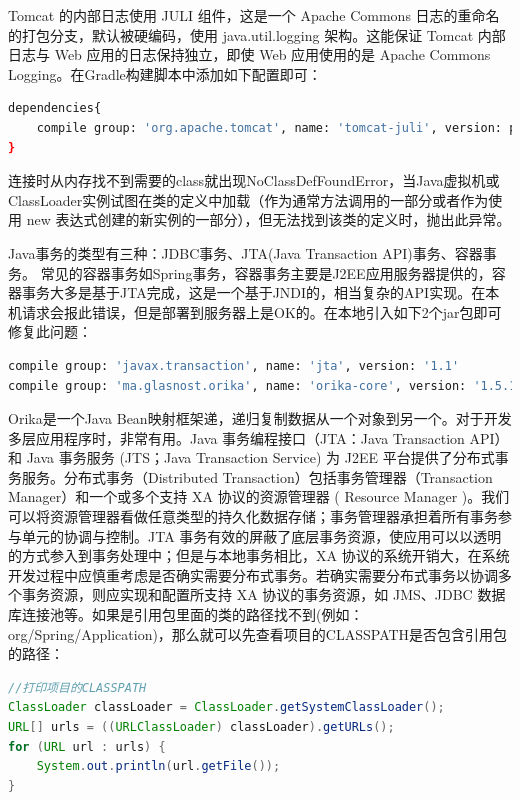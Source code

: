 \documentclass[12pt]{book}
\numberwithin{dummy}{section}
\theoremstyle{ocrenumbox}
\theoremstyle{blacknumex}
\theoremstyle{blacknumbox}
\theoremstyle{ocrenum}
\begin{document}
Tomcat 的内部日志使用 JULI 组件，这是一个 Apache Commons 日志的重命名的打包分支，默认被硬编码，使用 java.util.logging 架构。这能保证 Tomcat 内部日志与 Web 应用的日志保持独立，即使 Web 应用使用的是 Apache Commons Logging。在Gradle构建脚本中添加如下配置即可：

\begin{lstlisting}[language=Bash]
dependencies{
	compile group: 'org.apache.tomcat', name: 'tomcat-juli', version: property('tomcat.version')
}
\end{lstlisting}

连接时从内存找不到需要的class就出现NoClassDefFoundError，当Java虚拟机或 ClassLoader实例试图在类的定义中加载（作为通常方法调用的一部分或者作为使用 new 表达式创建的新实例的一部分），但无法找到该类的定义时，抛出此异常。 

Java事务的类型有三种：JDBC事务、JTA(Java Transaction API)事务、容器事务。 常见的容器事务如Spring事务，容器事务主要是J2EE应用服务器提供的，容器事务大多是基于JTA完成，这是一个基于JNDI的，相当复杂的API实现。在本机请求会报此错误，但是部署到服务器上是OK的。在本地引入如下2个jar包即可修复此问题：

\begin{lstlisting}[language=Bash]
compile group: 'javax.transaction', name: 'jta', version: '1.1'
compile group: 'ma.glasnost.orika', name: 'orika-core', version: '1.5.1'
\end{lstlisting}

Orika是一个Java Bean映射框架递，递归复制数据从一个对象到另一个。对于开发多层应用程序时，非常有用。Java 事务编程接口（JTA：Java Transaction API）和 Java 事务服务 (JTS；Java Transaction Service) 为 J2EE 平台提供了分布式事务服务。分布式事务（Distributed Transaction）包括事务管理器（Transaction Manager）和一个或多个支持 XA 协议的资源管理器 ( Resource Manager )。我们可以将资源管理器看做任意类型的持久化数据存储；事务管理器承担着所有事务参与单元的协调与控制。JTA 事务有效的屏蔽了底层事务资源，使应用可以以透明的方式参入到事务处理中；但是与本地事务相比，XA 协议的系统开销大，在系统开发过程中应慎重考虑是否确实需要分布式事务。若确实需要分布式事务以协调多个事务资源，则应实现和配置所支持 XA 协议的事务资源，如 JMS、JDBC 数据库连接池等。如果是引用包里面的类的路径找不到(例如：org/Spring/Application)，那么就可以先查看项目的CLASSPATH是否包含引用包的路径：

\begin{lstlisting}[language=Java]
//打印项目的CLASSPATH
ClassLoader classLoader = ClassLoader.getSystemClassLoader();
URL[] urls = ((URLClassLoader) classLoader).getURLs();
for (URL url : urls) {
	System.out.println(url.getFile());
}
\end{lstlisting}
\end{document}
